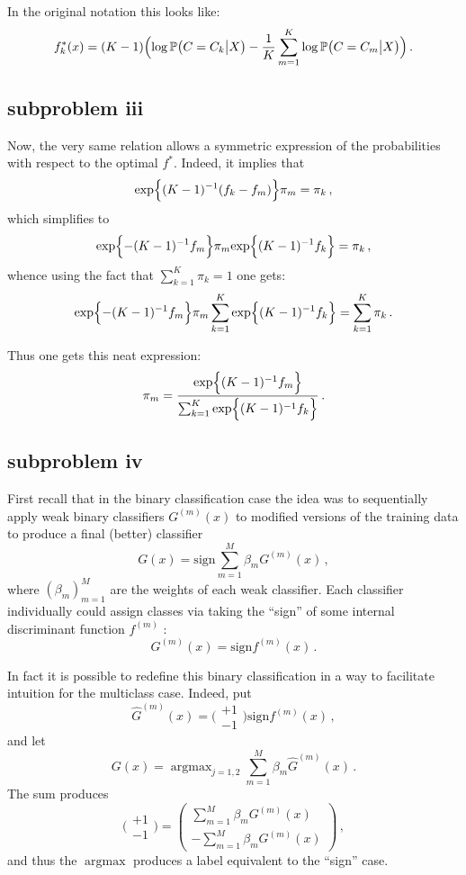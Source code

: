 \documentclass[a4paper]{article}
\newcommand{\pr}{\mathbb{P}}
\newcommand{\argmax}{\mathop{\text{argmax}}}
\begin{document}
In the original notation this looks like:
\[
f^*_k(x)
= (K-1) \Bigl( \log \pr\bigl( C = C_k \big\vert X \bigr)
	- \frac{1}{K}\sum_{m=1}^K \log \pr\bigl( C = C_m \big\vert X \bigr) \Bigr)
\,.\]

\subsection{subproblem iii} %
\label{sub:subproblem_iii}

Now, the very same relation allows a symmetric expression of the probabilities
with respect to the optimal $f^*$. Indeed, it implies that 
\[ \text{exp}\Bigl\{ (K-1)^{-1}(f_k - f_m) \Bigr\}\pi_m = \pi_k \,, \]
which simplifies to
\[ \text{exp}\Bigl\{ -(K-1)^{-1}f_m \Bigr\} \pi_m \text{exp}\Bigl\{ (K-1)^{-1}f_k \Bigr\} = \pi_k \,, \]
whence using the fact that $\sum_{k=1}^K \pi_k = 1$ one gets:
\[
\text{exp}\Bigl\{ -(K-1)^{-1}f_m \Bigr\} \pi_m
	\sum_{k=1}^K  \text{exp}\Bigl\{ (K-1)^{-1}f_k \Bigr\} = \sum_{k=1}^K \pi_k \,.
\]

Thus one gets this neat expression:
\[
\pi_m = \frac{\text{exp}\Bigl\{ (K-1)^{-1}f_m \Bigr\} }{
	\sum_{k=1}^K \text{exp}\Bigl\{ (K-1)^{-1}f_k \Bigr\}} \,.
\]


\subsection{subproblem iv} %
\label{sub:subproblem_iv}

First recall that in the binary classification case the idea was to sequentially
apply weak binary classifiers $G^{(m)}(x)$ to modified versions of the training
data to produce a final (better) classifier
\[ G(x) = \text{sign} \sum_{m=1}^M \beta_m G^{(m)}(x) \,, \]
where $(\beta_m)_{m=1}^M$ are the weights of each weak classifier.
Each classifier individually could assign classes via taking the ``sign'' of some
internal discriminant function $f^{(m)}$ :
\[ G^{(m)}(x) = \text{sign} f^{(m)}(x) \,. \]

In fact it is possible to redefine this binary classification in a way to facilitate
intuition for the multiclass case. Indeed, put
\[
\hat{G}^{(m)}(x) = \biggl(\begin{smallmatrix} +1\\-1 \end{smallmatrix}\biggr)
\text{sign} f^{(m)}(x)\,,
\]
and let
\[ G(x) = \argmax_{j=1,2} \sum_{m=1}^M \beta_m \hat{G}^{(m)}(x) \,. \]
The sum produces
\[
\biggl(\begin{smallmatrix} +1\\-1 \end{smallmatrix}\biggr)
= \begin{pmatrix} \sum_{m=1}^M \beta_m G^{(m)}(x)\\-\sum_{m=1}^M \beta_m G^{(m)}(x) \end{pmatrix}\,,
\]
and thus the $\argmax$ produces a label equivalent to the ``sign'' case.
\end{document}
